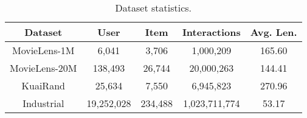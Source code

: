 \begin{table}[t]
\setlength{\abovecaptionskip}{-0cm}
\setlength{\belowcaptionskip}{-0.1cm}
 \caption{\small{Dataset statistics.}}
 \centering
 	\setlength{\tabcolsep}{1mm}
 \begin{tabular}{@{} c|c|c|c|c @{}}
 \hline
 \textbf{Dataset} 	  & \textbf{User}   & \textbf{Item} & \textbf{Interactions} & \textbf{Avg. Len.}   \\
 \hline
 MovieLens-1M  & 6,041 & 3,706 & 1,000,209 & 165.60   \\
 MovieLens-20M & 138,493 & 26,744 & 20,000,263 & 144.41   \\
 KuaiRand & 25,634 & 7,550 & 6,945,823 & 270.96 \\ 
 Industrial & 19,252,028 & 234,488 & 1,023,711,774 & 53.17 \\ 
 \hline
\end{tabular}
\label{tab:dataset_statistics}
\vspace{-5mm}
\end{table}

